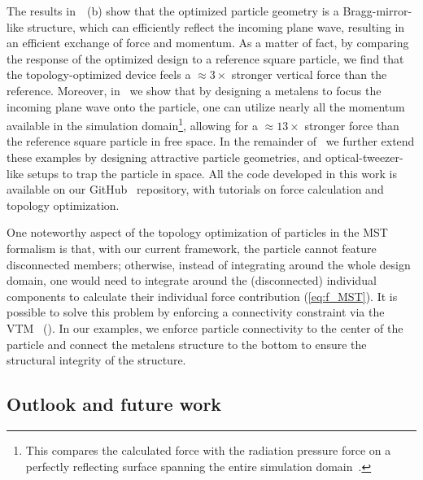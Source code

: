 The results in~~(b) show that the optimized particle geometry is a Bragg-mirror-like
structure, which can efficiently reflect the incoming plane wave, resulting in an efficient exchange of force and momentum. As a matter of fact, by comparing the response of the optimized design
to a reference square particle, we find that the topology-optimized device feels a $\approx 3\times$ stronger vertical force than the reference.
 Moreover, in~\cite{ownpub2} we show that by designing a metalens to focus the incoming plane wave onto the particle, one can utilize nearly all the momentum available in the simulation domain\footnote{This compares the calculated force with the radiation pressure force on a perfectly reflecting surface spanning the entire simulation domain~\cite{ownpub2}.},
 allowing for a $\approx 13\times$ stronger force than the reference square particle in free space. 
 In the remainder of~\cite{ownpub2} we further extend these examples by designing
attractive particle geometries, and optical-tweezer-like setups to trap the particle in space. All the code developed in this work is available on our GitHub~\cite{github_MST} repository, with tutorials on force calculation and topology optimization. 

One noteworthy aspect of the topology optimization of particles in the MST formalism is that, with our current framework, the particle cannot feature disconnected members; otherwise, instead of integrating around the whole design domain,
one would need to integrate around the (disconnected) individual components
 to calculate their individual force contribution (\eqref{eq:f_MST}). It is possible to solve this problem by enforcing 
a connectivity constraint via the VTM~\cite{li_structural_2016} (). In our examples,
we enforce particle connectivity to the center of the particle and connect the metalens structure to the bottom to ensure the structural
integrity of the structure.

\subsection*{Outlook and future work}

